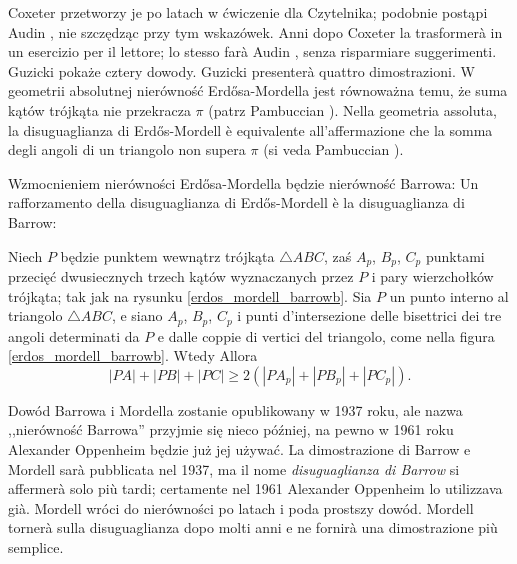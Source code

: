 Coxeter \cite[s. 25]{coxeter_1967} przetworzy je po latach w ćwiczenie dla Czytelnika; podobnie postąpi Audin \cite[s. 102]{audin_2003}, nie szczędząc przy tym wskazówek. %
Anni dopo Coxeter \cite[p. 25]{coxeter_1967} la trasformerà in un esercizio per il lettore; lo stesso farà Audin \cite[p. 102]{audin_2003}, senza risparmiare suggerimenti. %
Guzicki \cite[s. 380-385]{guzicki_2021} pokaże cztery dowody. %
Guzicki \cite[p. 380-385]{guzicki_2021} presenterà quattro dimostrazioni. %
W geometrii absolutnej nierówność Erdősa-Mordella jest równoważna temu, że suma kątów trójkąta nie przekracza $\pi$ (patrz Pambuccian \cite{pambuccian_2008}). %
Nella geometria assoluta, la disuguaglianza di Erdős-Mordell è equivalente all'affermazione che la somma degli angoli di un triangolo non supera $\pi$ (si veda Pambuccian \cite{pambuccian_2008}). %
%

Wzmocnieniem nierówności Erdősa-Mordella będzie nierówność Barrowa: %
Un rafforzamento della disuguaglianza di Erdős-Mordell è la disuguaglianza di Barrow: %


\begin{theorem}
[nierówność Barrowa] %
[disuguaglianza di Barrow] %
    Niech $P$ będzie punktem wewnątrz trójkąta $\triangle ABC$, zaś $A_p$, $B_p$, $C_p$ punktami przecięć dwusiecznych trzech kątów wyznaczanych przez $P$ i pary wierzchołków trójkąta; tak jak na rysunku \ref{erdos_mordell_barrowb}. %
    Sia $P$ un punto interno al triangolo $\triangle ABC$, e siano $A_p$, $B_p$, $C_p$ i punti d'intersezione delle bisettrici dei tre angoli determinati da $P$ e dalle coppie di vertici del triangolo, come nella figura \ref{erdos_mordell_barrowb}. %
    Wtedy %
    Allora %
    \begin{equation}
        |PA| + |PB| + |PC| \ge 2 (|PA_p| + |PB_p| + |PC_p|).
    \end{equation}
\end{theorem}

Dowód Barrowa i Mordella \cite{mordell_barrow_1937} zostanie opublikowany w 1937 roku, ale nazwa ,,nierówność Barrowa'' przyjmie się nieco później, na pewno w 1961 roku Alexander Oppenheim będzie już jej używać. %
La dimostrazione di Barrow e Mordell \cite{mordell_barrow_1937} sarà pubblicata nel 1937, ma il nome \emph{disuguaglianza di Barrow} si affermerà solo più tardi; certamente nel 1961 Alexander Oppenheim lo utilizzava già. %
%
Mordell \cite{mordell_1962} wróci do nierówności po latach i poda prostszy dowód. %
Mordell \cite{mordell_1962} tornerà sulla disuguaglianza dopo molti anni e ne fornirà una dimostrazione più semplice. %
%


%